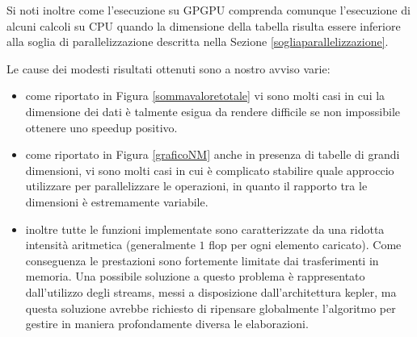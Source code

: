 \documentclass[a4paper]{article}   %
\begin{document}
Si noti inoltre come l'esecuzione su GPGPU comprenda comunque l'esecuzione di alcuni calcoli su CPU quando la dimensione della tabella risulta essere inferiore alla soglia di parallelizzazione descritta nella Sezione \ref{sogliaparallelizzazione}.

Le cause dei modesti risultati ottenuti sono a nostro avviso varie:
\begin{itemize}
\item come riportato in Figura \ref{sommavaloretotale} vi sono molti casi in cui la dimensione dei dati è talmente esigua da rendere difficile se non impossibile ottenere uno speedup positivo. 
\item come riportato in Figura \ref{graficoNM} anche in presenza di tabelle di grandi dimensioni, vi sono molti casi in cui è complicato stabilire quale approccio utilizzare per parallelizzare le operazioni, in quanto il rapporto tra le dimensioni è estremamente variabile. %
\item inoltre tutte le funzioni implementate sono caratterizzate da una ridotta intensità aritmetica (generalmente $1$ flop per ogni elemento caricato). Come conseguenza le prestazioni sono fortemente limitate dai trasferimenti in memoria. Una possibile soluzione a questo problema è rappresentato dall'utilizzo degli streams, messi a disposizione dall'architettura kepler, ma questa soluzione avrebbe richiesto di ripensare globalmente l'algoritmo per gestire in maniera profondamente diversa le elaborazioni.
\end{itemize}


\end{document}
